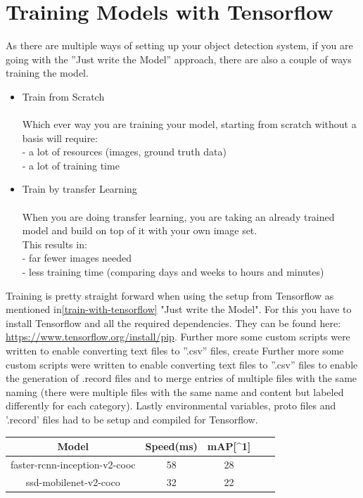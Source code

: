 \section{Training Models with Tensorflow}\label{models-with-tensorflow}
As there are multiple ways of setting up your object detection system, if you are going with the ''Just write the Model'' approach, there
are also a couple of ways training the model.
\begin{itemize}
    \item Train from Scratch \\ \\
        Which ever way you are training your model, starting from scratch without a basis will require: \\
        {- a lot of resources (images, ground truth data)} \\
        {- a lot of training time} \\
    \item Train by transfer Learning \\ \\
        When you are doing transfer learning, you are taking an already trained model and build on top of it with your own image set.\\
        This results in: \\
        {- far fewer images needed} \\
        {- less training time (comparing days and weeks to hours and minutes)} \\
\end{itemize}
Training is pretty straight forward when using the setup from Tensorflow as mentioned in\ref{train-with-tensorflow} "Just write the Model".
For this you have to install Tensorflow and all the required dependencies. They can be found here:
\url{https://www.tensorflow.org/install/pip}. Further more some custom scripts were written to enable converting text files to ''.csv''
files, create   Further more some custom scripts were written to enable converting text files to ''.csv''
files to enable the generation of .record files and to merge entries of multiple files with the same naming (there were multiple files with
the same name and content but labeled differently for each category). Lastly environmental variables, proto
files and '.record' files had to be setup and compiled for Tensorflow.
\begin{center}
    \begin{tabular}{|c|c|c|c|c|}
        \hline
        Model & Speed(ms) &  mAP[{\textasciicircum}1] \\ \hline
        faster-rcnn-inception-v2-cooc & 58 & 28 \\ \hline
        ssd-mobilenet-v2-coco & 32 & 22 \\ \hline
    \end{tabular}
\end{center}
